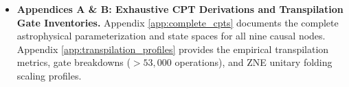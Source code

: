 \begin{itemize}
    \item \textbf{Appendices A \& B: Exhaustive CPT Derivations and Transpilation Gate Inventories.} Appendix \ref{app:complete_cpts} documents the complete astrophysical parameterization and state spaces for all nine causal nodes. Appendix \ref{app:transpilation_profiles} provides the empirical transpilation metrics, gate breakdowns ($>53,000$ operations), and ZNE unitary folding scaling profiles.
\end{itemize}
